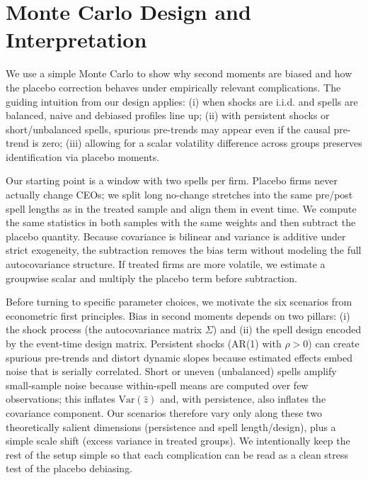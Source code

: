 \documentclass[11pt,a4paper]{article}
\newcommand{\Var}{\text{Var}}
\begin{document}
\section{Monte Carlo Design and Interpretation}

We use a simple Monte Carlo to show why second moments are biased and how the placebo correction behaves under empirically relevant complications. The guiding intuition from our design applies: (i) when shocks are i.i.d. and spells are balanced, naive and debiased profiles line up; (ii) with persistent shocks or short/unbalanced spells, spurious pre-trends may appear even if the causal pre-trend is zero; (iii) allowing for a scalar volatility difference across groups preserves identification via placebo moments.

Our starting point is a window with two spells per firm. Placebo firms never actually change CEOs; we split long no-change stretches into the same pre/post spell lengths as in the treated sample and align them in event time. We compute the same statistics in both samples with the same weights and then subtract the placebo quantity. Because covariance is bilinear and variance is additive under strict exogeneity, the subtraction removes the bias term without modeling the full autocovariance structure. If treated firms are more volatile, we estimate a groupwise scalar and multiply the placebo term before subtraction.

Before turning to specific parameter choices, we motivate the six scenarios from econometric first principles. Bias in second moments depends on two pillars: (i) the shock process (the autocovariance matrix \(\Sigma\)) and (ii) the spell design encoded by the event-time design matrix. Persistent shocks (AR(1) with \(\rho>0\)) can create spurious pre-trends and distort dynamic slopes because estimated effects embed noise that is serially correlated. Short or uneven (unbalanced) spells amplify small-sample noise because within-spell means are computed over few observations; this inflates \(\Var(\hat z)\) and, with persistence, also inflates the covariance component. Our scenarios therefore vary only along these two theoretically salient dimensions (persistence and spell length/design), plus a simple scale shift (excess variance in treated groups). We intentionally keep the rest of the setup simple so that each complication can be read as a clean stress test of the placebo debiasing.
\end{document}
